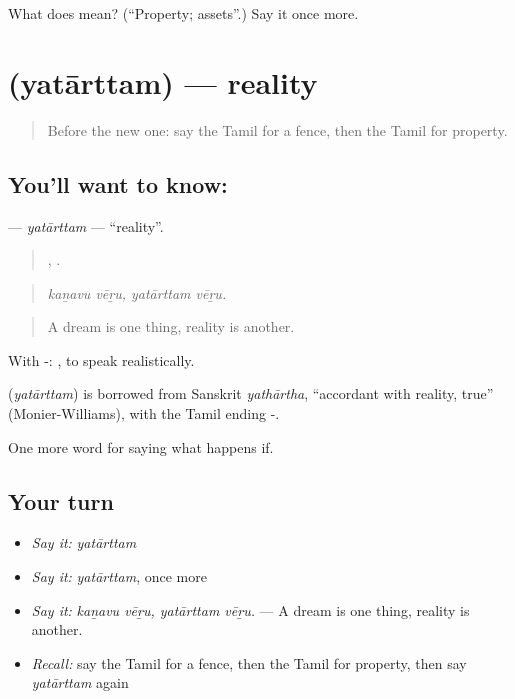 \begin{tcolorbox}[breakable,colback=teal!4,colframe=teal!35!black,title={Before you move on}]
What does  mean? (\textquotedblleft{}Property; assets\textquotedblright{}.) Say it once more.
\end{tcolorbox}
\section[\texorpdfstring{\ta{யதார்த்தம்} (yatārttam)}{யதார்த்தம் (yatārttam)}]{ (yatārttam) — reality}

\label{lesson:TA-C551-yatarttam}



\begin{quote}
Before the new one: say the Tamil for a fence, then the Tamil for property.
\end{quote}

\subsection*{You'll want to know: }
\textbf{} — \emph{yatārttam} — \textquotedblleft{}reality\textquotedblright{}.

\begin{quote}
 ,  .
\end{quote}

\begin{quote}
\emph{kaṉavu vēṟu, yatārttam vēṟu.}
\end{quote}

\begin{quote}
A dream is one thing, reality is another.
\end{quote}

With -:  , to speak realistically.

\begin{cousinweb}
\textbf{} (\emph{yatārttam}) is borrowed from Sanskrit \emph{yathārtha}, \textquotedblleft{}accordant with reality, true\textquotedblright{} (Monier-Williams), with the Tamil ending -.
\end{cousinweb}

\begin{grammarlens}[title={What you've built}]
One more word for saying what happens if.
\end{grammarlens}

\subsection*{Your turn}
\begin{itemize}
\raggedright
  \item \emph{Say it:} \emph{yatārttam}
  \item \emph{Say it:} \emph{yatārttam}, once more
  \item \emph{Say it:} \emph{kaṉavu vēṟu, yatārttam vēṟu.} — A dream is one thing, reality is another.
  \item \emph{Recall:} say the Tamil for a fence, then the Tamil for property, then say \emph{yatārttam} again
\end{itemize}

